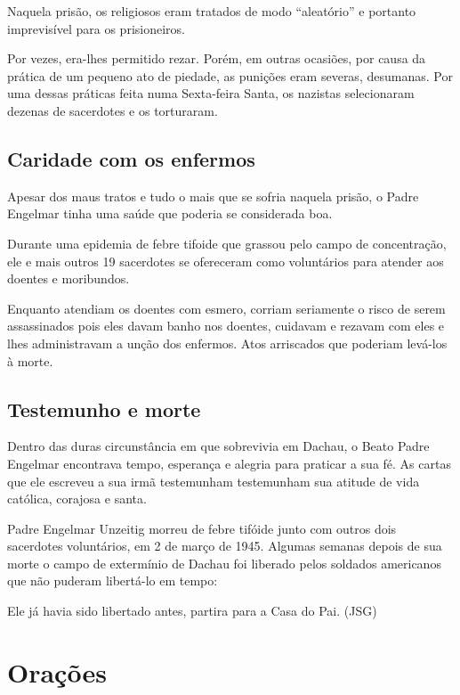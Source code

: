 \documentclass[a4paper,14pt]{extarticle} \usepackage[utf8]{inputenc}
\begin{document}
Naquela prisão, os religiosos eram tratados de modo “aleatório” e portanto imprevisível para os prisioneiros.

Por vezes, era-lhes permitido rezar. Porém, em outras ocasiões, por causa da prática de um pequeno ato de piedade, as punições eram severas, desumanas. Por uma dessas práticas feita numa Sexta-feira Santa, os nazistas selecionaram dezenas de sacerdotes e os torturaram.

\subsection{Caridade com os enfermos}

Apesar dos maus tratos e tudo o mais que se sofria naquela prisão, o Padre Engelmar tinha uma saúde que poderia se considerada boa.

Durante uma epidemia de febre tifoide que grassou pelo campo de concentração, ele e mais outros 19 sacerdotes se ofereceram como voluntários para atender aos doentes e moribundos.

Enquanto atendiam os doentes com esmero, corriam seriamente o risco de serem assassinados pois eles davam banho nos doentes, cuidavam e rezavam com eles e lhes administravam a unção dos enfermos. Atos arriscados que poderiam levá-los à morte.

\subsection{Testemunho e morte}

Dentro das duras circunstância em que sobrevivia em Dachau, o Beato Padre Engelmar encontrava tempo, esperança e alegria para praticar a sua fé. As cartas que ele escreveu a sua irmã testemunham testemunham sua atitude de vida católica, corajosa e santa.

Padre Engelmar Unzeitig morreu de febre tifóide junto com outros dois sacerdotes voluntários, em 2 de março de 1945. Algumas semanas depois de sua morte o campo de extermínio de Dachau foi liberado pelos soldados americanos que não puderam libertá-lo em tempo:

Ele já havia sido libertado antes, partira para a Casa do Pai. (JSG)

\newpage

\vfill

\section{Orações}
\end{document}
